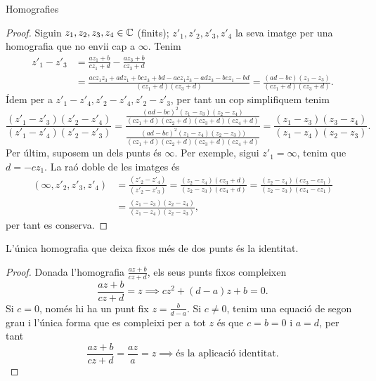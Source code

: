 \documentclass[dvipsnames, svgnames, leqno, a4paper, 12pt]{report}
\begin{document}
\begin{chapter}{Homografies}
    \begin{proof}
        Siguin $z_1,z_2,z_3,z_4\in \mathbb{C}$ (finits); $z'_1,z'_2,z'_3,z'_4$ la seva imatge per una homografia que no envii cap a $\infty$. Tenim 
        \footnotesize
        \begin{align*}
            z'_1-z'_3 &=\frac{az_1+b}{cz_1+d}-\frac{az_3+b}{cz_3+d}\\
            &= \frac{acz_1z_3+adz_1+bcz_3+bd-acz_1z_3-adz_3-bcz_1-bd}{(cz_1+d)(cz_3+d)}
            = \frac{(ad-bc)(z_1-z_3)}{(cz_1+d)(cz_3+d)}.
        \end{align*}
        \normalsize
        Ídem per a $z'_1-z'_4, z'_2-z'_4, z'_2-z'_3$, per tant un cop simplifiquem tenim 
        \begin{displaymath}
            \frac{(z'_1-z'_3)(z'_2-z'_4)}{(z'_1-z'_4)(z'_2-z'_3)}=\frac{\frac{(ad-bc)^2(z_1-z_3)(z_2-z_4)}{(cz_1+d)(cz_2+d)(cz_3+d)(cz_4+d)}}{\frac{(ad-bc)^2(z_1-z_4)(z_2-z_3))}{(cz_1+d)(cz_2+d)(cz_3+d)(cz_4+d)}} = \frac{(z_1-z_3)(z_3-z_4)}{(z_1-z_4)(z_2-z_3)}.
        \end{displaymath}
        Per últim, suposem un dels punts és $\infty$. Per exemple, sigui $z'_1=\infty$, tenim que $d=-cz_1$. La raó doble de les imatges és 
        \begin{align*}
            (\infty,z'_2,z'_3,z'_4) &=\frac{(z'_2-z'_4)}{(z'_2-z'_3)}=\frac{(z_2-z_4)(cz_3+d)}{(z_2-z_3)(cz_4+d)}=\frac{(z_2-z_4)(cz_3-cz_1)}{(z_2-z_3)(cz_4-cz_1)}\\
            &=\frac{(z_1-z_3)(z_2-z_4)}{(z_1-z_4)(z_2-z_3)},
        \end{align*}
        per tant es conserva.
    \end{proof}

    \begin{theorem}
        L'única homografia que deixa fixos més de dos punts és la identitat.
    \end{theorem}

    \begin{proof}
        Donada l'homografia $\frac{az+b}{cz+d}$, els seus punts fixos compleixen 
        \begin{displaymath}
            \frac{az+b}{cz+d}=z\implies cz^2+(d-a)z+b=0.
        \end{displaymath}
        Si $c=0$, només hi ha un punt fix $z=\frac{b}{d-a}$. Si $c\neq0$, tenim una equació de segon grau i l'única forma que es compleixi per a tot $z$ és que $c=b=0$ i $a=d$, per tant 
        \begin{displaymath}
            \frac{az+b}{cz+d}=\frac{az}{a}=z\implies \text{és la aplicació identitat.}
        \end{displaymath}
    \end{proof}


\end{chapter}
\end{document}
